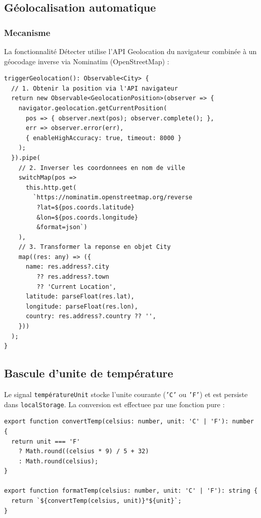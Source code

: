 \documentclass[12pt,a4paper]{article}
\begin{document}
\subsection{Géolocalisation automatique}

\subsubsection{Mecanisme}

La fonctionnalité \og{}Détecter\fg{} utilise l'API Geolocation du navigateur combinée à un géocodage inverse via Nominatim (OpenStreetMap) :

\begin{lstlisting}[style=angular, caption={Chaîne complète de géolocalisation}]
triggerGeolocation(): Observable<City> {
  // 1. Obtenir la position via l'API navigateur
  return new Observable<GeolocationPosition>(observer => {
    navigator.geolocation.getCurrentPosition(
      pos => { observer.next(pos); observer.complete(); },
      err => observer.error(err),
      { enableHighAccuracy: true, timeout: 8000 }
    );
  }).pipe(
    // 2. Inverser les coordonnees en nom de ville
    switchMap(pos =>
      this.http.get(
        `https://nominatim.openstreetmap.org/reverse
         ?lat=${pos.coords.latitude}
         &lon=${pos.coords.longitude}
         &format=json`)
    ),
    // 3. Transformer la reponse en objet City
    map((res: any) => ({
      name: res.address?.city
         ?? res.address?.town
         ?? 'Current Location',
      latitude: parseFloat(res.lat),
      longitude: parseFloat(res.lon),
      country: res.address?.country ?? '',
    }))
  );
}
\end{lstlisting}

\subsection{Bascule d'unite de température}

Le signal \texttt{températureUnit} stocke l'unite courante (\texttt{'C'} ou \texttt{'F'}) et est persiste dans \texttt{localStorage}. La conversion est effectuee par une fonction pure :

\begin{lstlisting}[style=angular, caption={Conversion de température}]
export function convertTemp(celsius: number, unit: 'C' | 'F'): number {
  return unit === 'F'
    ? Math.round((celsius * 9) / 5 + 32)
    : Math.round(celsius);
}

export function formatTemp(celsius: number, unit: 'C' | 'F'): string {
  return `${convertTemp(celsius, unit)}°${unit}`;
}
\end{lstlisting}
\end{document}
